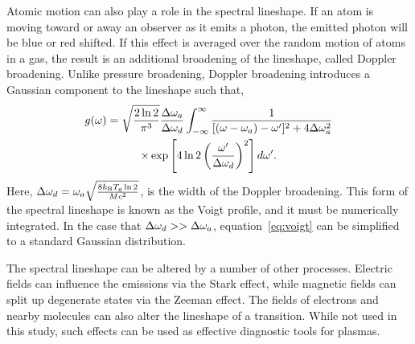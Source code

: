 Atomic motion can also play a role in the spectral lineshape. If an atom is
moving toward or away an observer as it emits a photon, the emitted photon will
be blue or red shifted. If this effect is averaged over the random motion of
atoms in a gas, the result is an additional broadening of the lineshape, called
Doppler broadening. Unlike pressure broadening, Doppler broadening introduces a
Gaussian component to the lineshape such that,
\begin{multline}
  g(\omega) = \sqrt{\frac{2\ln{2}}{\pi^3}}\frac{\Delta \omega_a}{\Delta \omega_d}
  \int_{-\infty}^\infty
  \frac{1}{[(\omega - \omega_a) - \omega']^2 + 4\Delta \omega_a^2} \\
  \times \exp\left[4\ln{2}\left(\frac{\omega'}{\Delta \omega_d}\right)^2\right]d\omega'.
  \label{eq:voigt}
\end{multline}
Here, $\Delta \omega_d = \omega_a\sqrt{\frac{8k_\mathrm{B}T_\mathrm{g}\ln{2}} {Mc^2}}$, is
the width of the Doppler broadening. This form of the spectral lineshape is
known as the Voigt profile, and it must be numerically integrated. In the case
that $\Delta \omega_d >> \Delta \omega_a$, equation~\ref{eq:voigt} can be simplified to a standard
Gaussian distribution.

The spectral lineshape can be altered by a number of other processes. Electric
fields can influence the emissions via the Stark effect, while magnetic fields
can split up degenerate states via the Zeeman effect. The fields of electrons
and nearby molecules can also alter the lineshape of a transition. While not
used in this study, such effects can be used as effective diagnostic tools for
plasmas.

